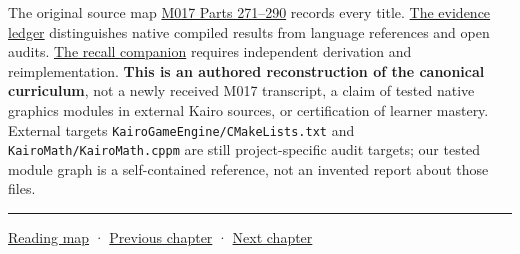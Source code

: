 The original source map \hyperref[appendix-fd090d982a15-m017-parts-271290-lazy-asset-queries-allocation-lifetimes-and-compiled-api-boundaries]{M017 Parts 271--290} records every title. \hyperref[appendix-a103e7846d21-phase-7-additive-reconstruction-m017-parts-271290]{The evidence ledger} distinguishes native compiled results from language references and open audits. \hyperref[appendix-960160274237-from-borrowed-reports-to-module-boundaries-m017-reconstruction]{The recall companion} requires independent derivation and reimplementation. \textbf{This is an authored reconstruction of the canonical curriculum}, not a newly received M017 transcript, a claim of tested native graphics modules in external Kairo sources, or certification of learner mastery. External targets \texttt{KairoGameEngine/CMakeLists.txt} and \texttt{KairoMath/KairoMath.cppm} are still project-specific audit targets; our tested module graph is a self-contained reference, not an invented report about those files.

\begin{center}\rule{0.5\linewidth}{0.5pt}\end{center}

\hyperref[volume-reading-map]{Reading map} · \hyperref[01-foundations-i-ch005-generic-asset-pipelines-without-hidden-contracts]{Previous chapter} · \hyperref[01-foundations-i-ch007-typed-interfaces-identity-and-data-structures]{Next chapter}
